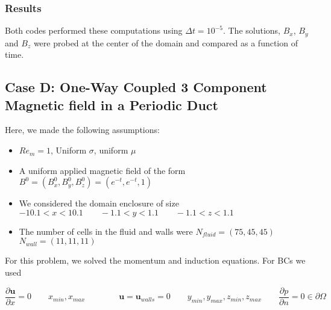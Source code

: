 \documentclass[11pt]{article}
\newcommand{\figS}{22.1em}
\newcommand{\figH}{\figS}
\newcommand{\figW}{\figS}
\begin{document}
\subsubsection{Results}
Both codes performed these computations using $\Delta t = 10^{-5}$. The solutions, $B_x$, $B_y$ and $B_z$ were probed at the center of the domain and compared as a function of time.

\begin{figure}[H]
 \centering
   \caption[Optional ]{}
\end{figure}

\begin{figure}[H]
 \centering
   \caption[Optional ]{}
\end{figure}

\subsection{Case D: One-Way Coupled 3 Component Magnetic field in a Periodic Duct}

Here, we made the following assumptions:

\begin{itemize}
\item $Re_m = 1$, Uniform $\sigma$, uniform $\mu$
\item A uniform applied magnetic field of the form $B^0 = (B_x^0,B_y^0,B_z^0) = (e^{-t},e^{-t},1)$
\item We considered the domain enclosure of size $-10.1 < x < 10.1 \qquad -1.1 < y < 1.1 \qquad -1.1 < z < 1.1$
\item The number of cells in the fluid and walls were $N_{fluid} = (75,45,45)$ \qquad $N_{wall} = (11,11,11)$
\end{itemize}


For this problem, we solved the momentum and induction equations. For BCs we used

\begin{equation}
	\frac{\partial \pmb{u}}{\partial x} = 0
	\qquad
	x_{min},x_{max}
	\qquad \qquad
	\pmb{u} = \pmb{u}_{walls} = 0
	\qquad
	y_{min},y_{max},
	z_{min},z_{max}
	\qquad
	\frac{\partial p}{\partial n} = 0
	\in \partial \Omega
\end{equation}
\end{document}

